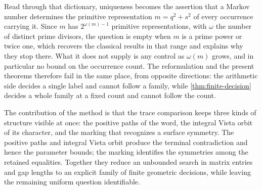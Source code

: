 Read through that dictionary, uniqueness becomes the assertion that a Markov
number determines the primitive representation $m=q^2+s^2$ of every occurrence
carrying it. Since $m$ has $2^{\omega(m)-1}$ primitive representations, with
$\omega$ the number of distinct prime divisors, the question is empty when $m$
is a prime power or twice one, which recovers the classical results in that
range and explains why they stop there. What it does not supply is any control
as $\omega(m)$ grows, and in particular no bound on the occurrence count. The
reformulation and the present theorems therefore fail in the same place, from
opposite directions: the arithmetic side decides a single label and cannot
follow a family, while \cref{thm:finite-decision} decides a whole family at a
fixed count and cannot follow the count.

The contribution of the method is that the trace comparison keeps
three kinds of structure visible at once: the positive paths of the
word, the integral Vieta orbit of its character, and the marking that
recognizes a surface symmetry. The positive paths and integral Vieta
orbit produce the terminal contradiction and hence the parameter bounds;
the marking identifies the symmetries among the retained equalities.
Together they reduce an unbounded search in matrix entries and gap
lengths to an explicit family of finite geometric decisions, while
leaving the remaining uniform question identifiable.
